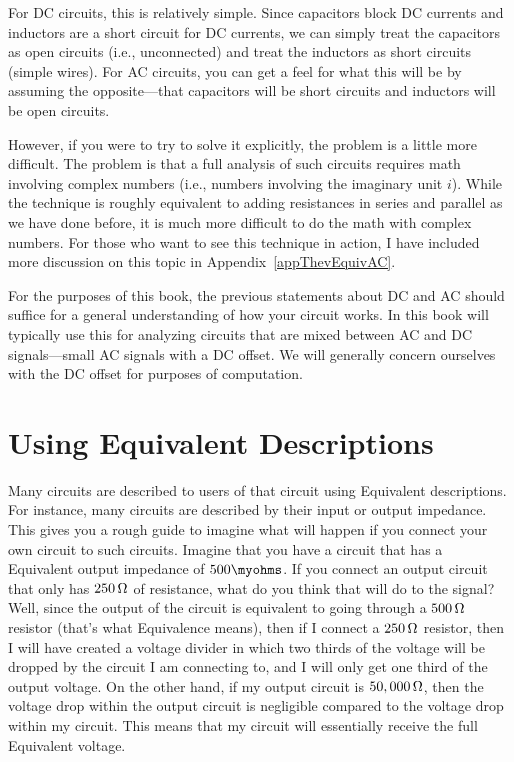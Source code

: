 For DC circuits, this is relatively simple. 
Since capacitors block DC currents and inductors are a short circuit for DC currents, we can simply treat the capacitors as open circuits (i.e., unconnected) and treat the inductors as short circuits (simple wires).
For AC circuits, you can get a feel for what this will be by assuming the opposite---that capacitors will be short circuits and inductors will be open circuits.

However, if you were to try to solve it explicitly, the problem is a little more difficult.
The problem is that a full analysis of such circuits requires math involving complex numbers (i.e., numbers involving the imaginary unit $i$).  
While the technique is roughly equivalent to adding resistances in series and parallel as we have done before, it is much more difficult to do the math with complex numbers.
For those who want to see this technique in action, I have included more discussion on this topic in Appendix~\ref{appThevEquivAC}.

For the purposes of this book, the previous statements about DC and AC should suffice for a general understanding of how your circuit works.
In this book will typically use this for analyzing circuits that are mixed between AC and DC signals---small AC signals with a DC offset.
We will generally concern ourselves with the DC offset for purposes of computation.

\section{Using \thev Equivalent Descriptions}

Many circuits are described to users of that circuit using \thev Equivalent descriptions.
For instance, many circuits are described by their input or output impedance.
This gives you a rough guide to imagine what will happen if you connect your own circuit to such circuits.
Imagine that you have a circuit that has a \thev Equivalent output impedance of $500\myohms$.
If you connect an output circuit that only has $250\,\si{\ohm}$ of resistance, what do you think that will do to the signal?
Well, since the output of the circuit is equivalent to going through a $500\,\si{\ohm}$ resistor (that's what \thev Equivalence means), then if I connect a $250\,\si{\ohm}$ resistor, then I will have created a voltage divider in which two thirds of the voltage will be dropped by the circuit I am connecting to, and I will only get one third of the output voltage.
On the other hand, if my output circuit is $50,000\,\si{\ohm}$, then the voltage drop within the output circuit is negligible compared to the voltage drop within my circuit.
This means that my circuit will essentially receive the full \thev Equivalent voltage.

